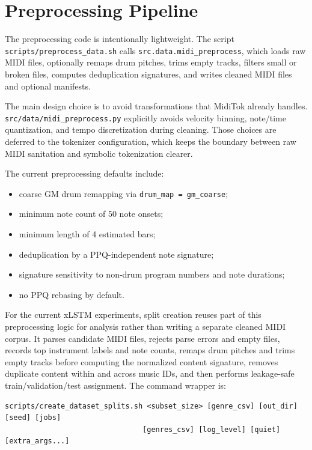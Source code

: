 \section{Preprocessing Pipeline} The preprocessing code is intentionally lightweight. The script \verb|scripts/preprocess_data.sh| calls \verb|src.data.midi_preprocess|, which loads raw MIDI files, optionally remaps drum pitches, trims empty tracks, filters small or broken files, computes deduplication signatures, and writes cleaned MIDI files and optional manifests.



The main design choice is to avoid transformations that MidiTok already handles. \verb|src/data/midi_preprocess.py| explicitly avoids velocity binning, note/time quantization, and tempo discretization during cleaning. Those choices are deferred to the tokenizer configuration, which keeps the boundary between raw MIDI sanitation and symbolic tokenization clearer.

The current preprocessing defaults include:
\begin{itemize}
	\item coarse GM drum remapping via \verb|drum_map = gm_coarse|;
	\item minimum note count of 50 note onsets;
	\item minimum length of 4 estimated bars;
	\item deduplication by a PPQ-independent note signature;
	\item signature sensitivity to non-drum program numbers and note durations;
	\item no PPQ rebasing by default.
\end{itemize}

For the current xLSTM experiments, split creation reuses part of this preprocessing logic for analysis rather than writing a separate cleaned MIDI corpus. It parses candidate MIDI files, rejects parse errors and empty files, records top instrument labels and note counts, remaps drum pitches and trims empty tracks before computing the normalized content signature, removes duplicate content within and across music IDs, and then performs leakage-safe train/validation/test assignment. The command wrapper is:
\begin{verbatim}
scripts/create_dataset_splits.sh <subset_size> [genre_csv] [out_dir] [seed] [jobs]
                                [genres_csv] [log_level] [quiet] [extra_args...]
\end{verbatim}
